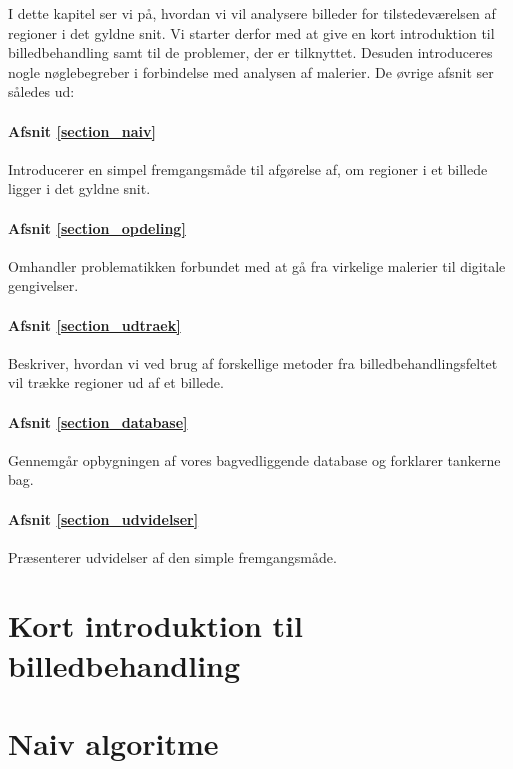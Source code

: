 {
{\sffamily I dette kapitel ser vi på, hvordan vi vil analysere billeder
for tilstedeværelsen af regioner i det gyldne snit. Vi starter derfor
med at give en kort introduktion til billedbehandling samt til de
problemer, der er tilknyttet. Desuden introduceres nogle nøglebegreber i
forbindelse med analysen af malerier. De øvrige afsnit ser således ud:

\paragraph{Afsnit \ref{section_naiv}} Introducerer en simpel
fremgangsmåde til afgørelse af, om regioner i et billede ligger i det
gyldne snit.

\paragraph{Afsnit \ref{section_opdeling}} Omhandler problematikken
forbundet med at gå fra virkelige malerier til digitale gengivelser.

\paragraph{Afsnit \ref{section_udtraek}} Beskriver, hvordan vi ved brug
af forskellige metoder fra billedbehandlingsfeltet vil trække regioner ud af
et billede.

\paragraph{Afsnit \ref{section_database}} Gennemgår opbygningen af vores
bagvedliggende database og forklarer tankerne bag.

\paragraph{Afsnit \ref{section_udvidelser}} Præsenterer udvidelser af
den simple fremgangsmåde.
}

\section{Kort introduktion til billedbehandling\label{section_kort_intro}}


\section{Naiv algoritme\label{section_naiv}}


}
